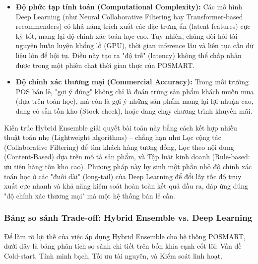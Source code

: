 \documentclass[12pt,a4paper]{report}
\begin{document}
\begin{itemize}
    \item \textbf{Độ phức tạp tính toán (Computational Complexity):} Các mô hình Deep Learning (như Neural Collaborative Filtering hay Transformer-based recommenders) có khả năng trích xuất các đặc trưng ẩn (latent features) cực kỳ tốt, mang lại độ chính xác toán học cao. Tuy nhiên, chúng đòi hỏi tài nguyên huấn luyện khổng lồ (GPU), thời gian inference lâu và liên tục cần dữ liệu lớn để hội tụ. Điều này tạo ra "độ trễ" (latency) không thể chấp nhận được trong một phiên chat thời gian thực của POSMART.
    \item \textbf{Độ chính xác thương mại (Commercial Accuracy):} Trong môi trường POS bán lẻ, "gợi ý đúng" không chỉ là đoán trúng sản phẩm khách muốn mua (dựa trên toán học), mà còn là gợi ý những sản phẩm mang lại lợi nhuận cao, đang có sẵn tồn kho (Stock check), hoặc đang chạy chương trình khuyến mãi.
\end{itemize}
 
Kiến trúc Hybrid Ensemble giải quyết bài toán này bằng cách kết hợp nhiều thuật toán nhẹ (Lightweight algorithms) -- chẳng hạn như Lọc cộng tác (Collaborative Filtering) để tìm khách hàng tương đồng, Lọc theo nội dung (Content-Based) dựa trên mô tả sản phẩm, và Tập luật kinh doanh (Rule-based: ưu tiên hàng tồn kho cao). Phương pháp này hy sinh một phần nhỏ độ chính xác toán học ở các "đuôi dài" (long-tail) của Deep Learning để đổi lấy tốc độ truy xuất cực nhanh và khả năng kiểm soát hoàn toàn kết quả đầu ra, đáp ứng đúng "độ chính xác thương mại" mà một hệ thống bán lẻ cần.
 
\subsubsection{Bảng so sánh Trade-off: Hybrid Ensemble vs. Deep Learning}
 
Để làm rõ lợi thế của việc áp dụng Hybrid Ensemble cho hệ thống POSMART, dưới đây là bảng phân tích so sánh chi tiết trên bốn khía cạnh cốt lõi: Vấn đề Cold-start, Tính minh bạch, Tối ưu tài nguyên, và Kiểm soát linh hoạt.
 
\end{document}

